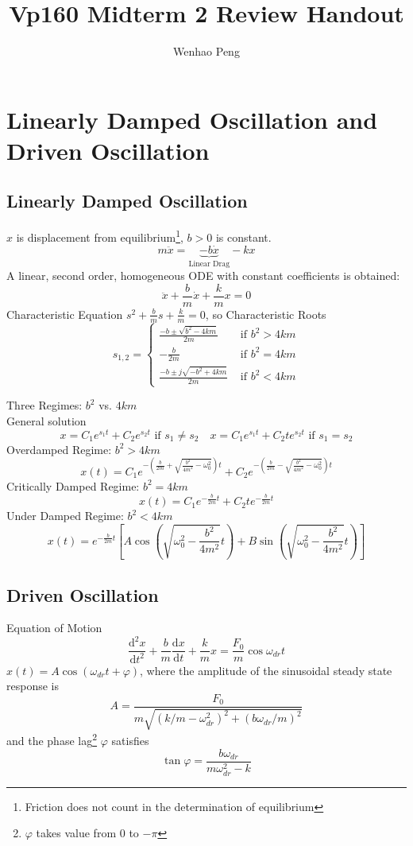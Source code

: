 \documentclass[a4paper,12pt,titlepage]{article}
\title{Vp160 Midterm 2 Review Handout}
\author{Wenhao Peng}
\begin{document}
\newcommand{\unit}[1]{\text{ }\mathrm{#1}}
\newcommand{\derivative}{\mathrm{d}}
\maketitle
\tableofcontents
\newpage
\section{Linearly Damped Oscillation and Driven Oscillation}
\subsection{Linearly Damped Oscillation}
$x$ is displacement from equilibrium\footnote{Friction does not count in the determination of equilibrium}, $b>0$ is constant.
\[m\ddot x=\underbrace{-b\dot x}_{\text{Linear Drag}}-kx\]
A linear, second order, homogeneous ODE with constant coefficients is obtained:
\[\ddot x+\frac{b}{m}\dot x+\frac{k}{m}x=0\]
Characteristic Equation $s^2+\frac{b}{m}s+\frac{k}{m}=0$, so Characteristic Roots\[s_{1,2}=\begin{cases}
\frac{-b\pm\sqrt{b^2-4km}}{2m}&\text{ if }b^2>4km\\
-\frac{b}{2m}&\text{ if }b^2=4km\\
\frac{-b\pm j\sqrt{-b^2+4km}}{2m}&\text{ if } b^2<4km
\end{cases}\]


Three Regimes: $b^2$ vs. $4km$\\
General solution
\[x=C_1 e^{s_1 t}+ C_2 e^{s_2 t}\text{ if }s_1\neq s_2\quad x=C_1 e^{s_1 t}+C_2 te^{s_2 t}\text{ if }s_1= s_2\]
Overdamped Regime: $b^2>4km$
\[x(t)=C_1 e^{-\left(\frac{b}{2m}+\sqrt{\frac{b^2}{4m^2}-\omega_0^2}\right)t}+C_2 e^{-\left(\frac{b}{2m}-\sqrt{\frac{b^2}{4m^2}-\omega_0^2}\right)t}\]
Critically Damped Regime: $b^2=4km$
\[x(t)=C_1e^{-\frac{b}{2m}t}+C_2te^{-\frac{b}{2m}t}\]
Under Damped Regime: $b^2<4km$
\[x(t)=e^{-\frac{b}{2m}t}\left[A\cos\left(\sqrt{\omega_0^2-\frac{b^2}{4m^2}}t\right)+B\sin\left(\sqrt{\omega_0^2-\frac{b^2}{4m^2}}t\right)\right]\]
\subsection{Driven Oscillation}
Equation of Motion
\[\frac{\derivative^2 x}{\derivative t^2}+\frac{b}{m}\frac{\derivative x}{\derivative t}+\frac{k}{m}x=\frac{F_0}{m}\cos\omega_{dr}t\]
$x(t)=A\cos(\omega_{dr}t+\varphi)$, where the amplitude of the sinusoidal steady state response is \[A=\frac{F_0}{m\sqrt{(k/m-\omega_{dr}^{2})^2+(b\omega_{dr}/m)^2}}\] and the phase lag\footnote{$\varphi$ takes value from $0$ to $-\pi$} $\varphi$ satisfies \[\tan\varphi=\frac{b\omega_{dr}}{m\omega_{dr}^{2}-k}\]
\end{document}
